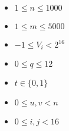 \begin{itemize}
\tightlist
\item $1 \le n \le 1000$
\item $1 \le m \le 5000$
\item $-1 \le V_i < 2^{16}$
\item $0 \le q \le 12$
\item $t \in \{0, 1\}$
\item $0 \le u, v < n$
\item $0 \le i, j < 16$
\end{itemize}
